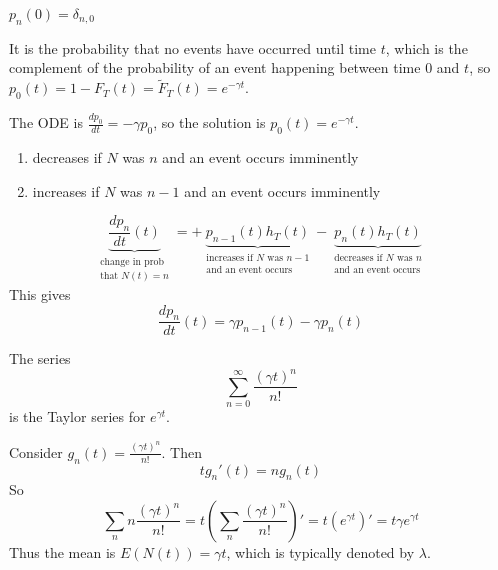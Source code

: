 \begin{solution}
	

\begin{slide}
\begin{parts}
	\item $p_n(0) = \delta_{n,0}$
	\item It is the probability that no events have occurred until time $t$, which is the complement of the probability of an event happening between time $0$ and $t$, so $p_0(t) = 1 - F_T(t) = \tilde{F}_T(t) = e^{-\gamma t}$.

	\item The ODE is $\frac{d p_0}{dt} = -\gamma p_0$, so the solution is $p_0(t) = e^{-\gamma t}$.

	\item 
	\begin{enumerate}
		\item decreases if $N$ was $n$ and an event occurs imminently
		\item increases if $N$ was $n-1$ and an event occurs imminently
	\end{enumerate}
	
	\item 	
	\[ 
		\underbrace{\frac{d p_n}{dt}(t)}_{\substack{\text{change in prob}\\\text{that $N(t)=n$}}}
		 = +\underbrace{p_{n-1}(t) h_T(t)}_{\substack{\text{increases if $N$ was $n-1$}\\\text{and an event occurs}}}
		 -\underbrace{p_{n}(t) h_T(t)}_{\substack{\text{decreases if $N$ was $n$}\\\text{and an event occurs}}}
	\]
	This gives 
	\[ 
		\frac{dp_n}{dt}(t) = \gamma p_{n-1}(t) - \gamma p_n(t)
	\]
	
	\item The series 
	\[ \sum_{n=0}^\infty \frac{(\gamma t)^n}{n!}  \]
	is the Taylor series for $e^{\gamma t}$.
	
	\item Consider $g_n(t) = \frac{(\gamma t)^n}{n!}$. Then
	\[t g_n'(t) = n g_n(t)\]
	So
	\[ \sum_n n \frac{(\gamma t)^n}{n!} 
		= t \left( \sum_n \frac{(\gamma t)^n}{n!}\right)'
		= t \left( e^{\gamma t} \right)'
		= t \gamma e^{\gamma t} \]
	Thus the mean is $E(N(t)) = \gamma t$, which is typically denoted by $\lambda$.

\end{parts}
	
\end{slide}
\end{solution}


